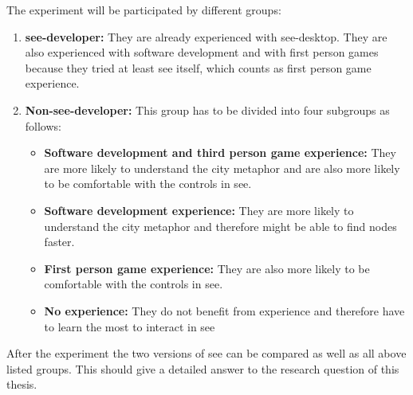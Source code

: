 The experiment will be participated by different groups:
\begin{enumerate}
  \item \textbf{\gls{see}-developer:} They are already experienced with \gls{see}-desktop.
        They are also experienced with software development and with first person games because they tried at least \gls{see} itself, which counts as first person game experience.
  \item \textbf{Non-\gls{see}-developer:} This group has to be divided into four subgroups as follows:
        \begin{itemize}
          \item \textbf{Software development and third person game experience:} They are more likely to understand the \gls{city} metaphor and are also more likely to be comfortable with the controls in \gls{see}.
          \item \textbf{Software development experience:} They are more likely to understand the \gls{city} metaphor and therefore might be able to find \glspl{node} faster.
          \item \textbf{First person game experience:} They are also more likely to be comfortable with the controls in \gls{see}.
          \item \textbf{No experience:} They do not benefit from experience and therefore have to learn the most to interact in \gls{see}
        \end{itemize}
\end{enumerate}

After the experiment the two versions of \gls{see} can be compared as well as all above listed groups. 
This should give a detailed answer to the research question of this thesis.

